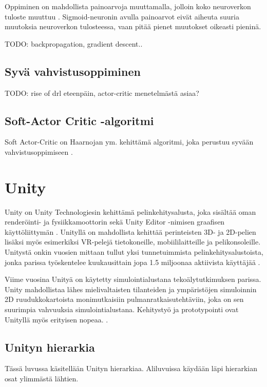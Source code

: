 \documentclass[utf8]{gradu3}
\begin{document}
Oppiminen on mahdollista painoarvoja muuttamalla, jolloin koko neuroverkon tuloste muuttuu \parencite{nielsen2015neural}. Sigmoid-neuronin avulla painoarvot eivät aiheuta suuria muutoksia neuroverkon tulosteessa, vaan pitää pienet muutokset oikeasti pieninä.

TODO: backpropagation, gradient descent..

\section{Syvä vahvistusoppiminen}
\label{sec:syvavahvistusoppiminen}


TODO: rise of drl eteenpäin, actor-critic menetelmästä asiaa?

\section{Soft-Actor Critic -algoritmi}

Soft Actor-Critic on Haarnojan ym. kehittämä algoritmi, joka perustuu syvään vahvistusoppimiseen \parencite{haarnoja2018soft}. 

\chapter{Unity}

Unity on Unity Technologiesin kehittämä pelinkehitysalusta, joka sisältää oman renderöinti- ja fysiikkamoottorin sekä Unity Editor -nimisen graafisen käyttöliittymän \parencite{juliani2018unity}. Unityllä on mahdollista kehittää perinteisten 3D- ja 2D-pelien lisäksi myös esimerkiksi VR-pelejä tietokoneille, mobiililaitteille ja pelikonsoleille. Unitystä onkin vuosien mittaan tullut yksi tunnetuimmista pelinkehitysalustoista, jonka parissa työskentelee kuukausittain jopa 1.5 miljoonaa aktiivista käyttäjää \parencite{unityweb}.

Viime vuosina Unityä on käytetty simulointialustana tekoälytutkimuksen parissa. Unity mahdollistaa lähes mielivaltaisten tilanteiden ja ympäristöjen simuloinnin 2D ruudukkokartoista monimutkaisiin pulmanratkaisutehtäviin, joka on sen suurimpia vahvuuksia simulointialustana. Kehitystyö ja prototypointi ovat Unityllä myös erityisen nopeaa. \parencite{juliani2018unity}.

\section{Unityn hierarkia}

Tässä luvussa käsitellään Unityn hierarkiaa. Aliluvuissa käydään läpi hierarkian osat ylimmästä lähtien.
\end{document}
